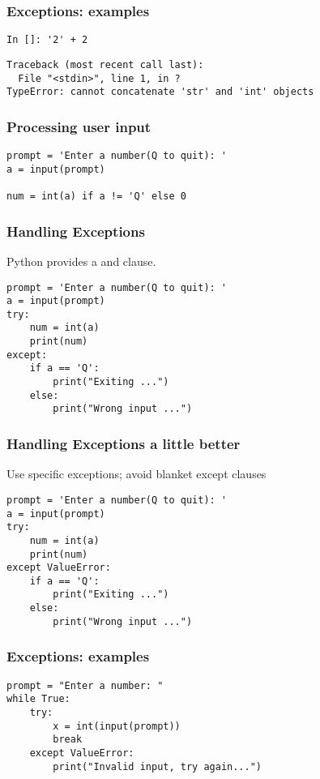 \documentclass[14pt,compress]{beamer}
\begin{document}
\begin{frame}[fragile]
  \frametitle{Exceptions: examples}
\begin{lstlisting}
In []: '2' + 2
\end{lstlisting}
\pause
\begin{lstlisting}
Traceback (most recent call last):
  File "<stdin>", line 1, in ?
TypeError: cannot concatenate 'str' and 'int' objects
\end{lstlisting}
\end{frame}


\begin{frame}[fragile]
  \frametitle{Processing user input}
  \begin{lstlisting}
prompt = 'Enter a number(Q to quit): '
a = input(prompt)

num = int(a) if a != 'Q' else 0
  \end{lstlisting}
\end{frame}


\begin{frame}[fragile]
  \frametitle{Handling Exceptions}
  Python provides a  and  clause.
  \begin{lstlisting}
prompt = 'Enter a number(Q to quit): '
a = input(prompt)
try:
    num = int(a)
    print(num)
except:
    if a == 'Q':
        print("Exiting ...")
    else:
        print("Wrong input ...")
  \end{lstlisting}
\end{frame}

\begin{frame}[fragile]
  \frametitle{Handling Exceptions a little better}
  Use specific exceptions; avoid blanket except clauses
  \begin{lstlisting}
prompt = 'Enter a number(Q to quit): '
a = input(prompt)
try:
    num = int(a)
    print(num)
except ValueError:
    if a == 'Q':
        print("Exiting ...")
    else:
        print("Wrong input ...")
  \end{lstlisting}
\end{frame}


\begin{frame}[fragile]
  \frametitle{Exceptions: examples}
  \small
\begin{lstlisting}
prompt = "Enter a number: "
while True:
    try:
        x = int(input(prompt))
        break
    except ValueError:
        print("Invalid input, try again...")

\end{lstlisting}
\end{frame}
\end{document}
